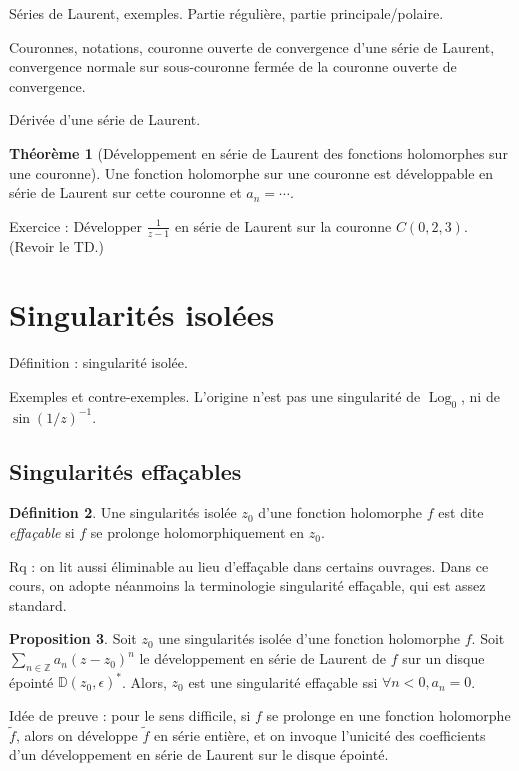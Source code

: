\documentclass[11pt,a4paper]{book}
\newcommand{\Z}{\mathbb{Z}}
\newcommand{\D}{\mathbb{D}}
\DeclareMathOperator{\Log}{\text{Log}}
\theoremstyle{definition}
\newtheorem{theoreme}{Th\'eor\`eme}[section]
\newtheorem{proposition}[theoreme]{Proposition}
\newtheorem{definition}[theoreme]{D\'efinition}
\theoremstyle{plain}
\begin{document}
Séries de Laurent, exemples.
Partie régulière, partie principale/polaire. 


Couronnes, notations, couronne ouverte de convergence d'une série de Laurent, convergence normale sur sous-couronne fermée de la couronne ouverte de convergence.

Dérivée d'une série de Laurent. 

\begin{theoreme}[Développement en série de Laurent des fonctions holomorphes sur une couronne]
Une fonction holomorphe sur une couronne est développable en série de Laurent sur cette couronne et $a_n = \cdots$.
\end{theoreme}


Exercice : Développer $\frac{1}{z-1}$ en série de Laurent sur la couronne $C(0,2,3)$. (Revoir le TD.)


\section{Singularités isolées}


Définition : singularité isolée.

Exemples et contre-exemples. L'origine n'est pas une singularité de $\Log_0$, ni de $\sin(1/z)^{-1}$.

\subsection{Singularités effaçables}

\begin{definition}
Une singularités isolée $z_0$ d'une fonction holomorphe $f$ est dite \emph{effaçable} si $f$ se prolonge holomorphiquement en $z_0$.
\end{definition}

Rq : on lit aussi \og éliminable\fg{} au lieu d'effaçable dans certains ouvrages. Dans ce cours, on adopte néanmoins la terminologie \og singularité effaçable\fg, qui est assez standard.

\begin{proposition}
Soit $z_0$ une singularités isolée d'une fonction holomorphe $f$.
Soit $\sum_{n\in \Z} a_n(z-z_0)^n$ le développement en série de Laurent de $f$ sur un disque épointé $\D(z_0,\epsilon)^*$.
Alors, $z_0$ est une singularité effaçable ssi $\forall n<0, a_n=0$.
\end{proposition}

Idée de preuve : pour le sens difficile, si $f$ se prolonge en une fonction holomorphe $\tilde f$, alors on développe $\tilde f$ en série entière, et on invoque l'unicité des coefficients d'un développement en série de Laurent sur le disque épointé.
\end{document}
